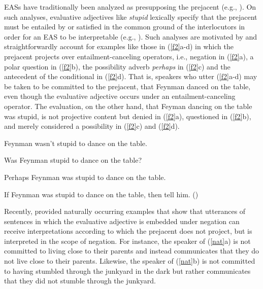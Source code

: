 \documentclass[11pt,fleqn]{article}
\newcommand{\6}{\mbox{$[\hspace*{-.6mm}[$}}
\newcommand{\9}{\mbox{$]\hspace*{-.6mm}]$}}
\begin{document}
EASs have traditionally been analyzed as presupposing the prejacent (e.g., \citealt{norrick78,barker02,oshima09b,kertz2010}). On such analyses,  evaluative adjectives like {\em stupid} lexically specify that the prejacent
must be entailed by or satisfied in the common ground of the interlocutors in
order for an EAS to be interpretable (e.g.,
\citealt{heim83,vds92}). Such analyses are motivated by and straightforwardly account for examples like those in (\ref{f2}a-d) in which the prejacent projects over entailment-canceling operators, i.e., negation in (\ref{f2}a), a polar question in (\ref{f2}b), the possibility adverb {\em perhaps} in (\ref{f2}c) and the antecedent of the conditional in (\ref{f2}d). That is, speakers who utter (\ref{f2}a-d) may be taken to be committed to the prejacent, that Feynman danced on the table, even though the evaluative adjective occurs under an entailment-canceling operator. The evaluation, on the other hand, that Feyman dancing on the table was stupid, is not projective content but denied in (\ref{f2}a), questioned in (\ref{f2}b), and merely considered a possibility in (\ref{f2}c) and (\ref{f2}d).

\begin{exe}

\ex\label{f2} 

\begin{xlist}

\ex Feynman wasn't stupid to dance on the table.

\ex Was Feynman stupid to dance on the table?

\ex Perhaps Feynman was stupid to dance on the table.

\ex If Feynman was stupid to dance on the table, then tell him. \hfill (\citealt[18f.]{barker02})

\end{xlist}
\end{exe}

Recently, \citet{karttunen-etal2014} provided naturally occurring examples that show that utterances of sentences in which the evaluative adjective is embedded under negation can receive interpretations according to which the prejacent
does not project, but is interpreted in the scope of negation. For instance, the speaker of (\ref{nat}a) is not committed to living close to their parents and instead communicates that they do not live close to their parents. Likewise, the speaker of (\ref{nat}b) is not committed to having stumbled through the junkyard in the dark but rather communicates that they did not stumble through the junkyard.
\end{document}
